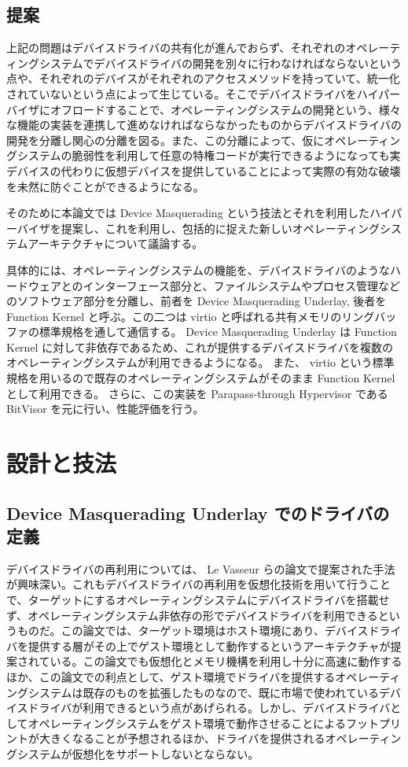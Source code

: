 \documentclass[a4paper,11pt,report]{ltjsbook}
\begin{document}
\section{提案}

上記の問題はデバイスドライバの共有化が進んでおらず、それぞれのオペレーティングシステムでデバイスドライバの開発を別々に行わなければならないという点や、それぞれのデバイスがそれぞれのアクセスメソッドを持っていて、統一化されていないという点によって生じている。そこでデバイスドライバをハイパーバイザにオフロードすることで、オペレーティングシステムの開発という、様々な機能の実装を連携して進めなければならなかったものからデバイスドライバの開発を分離し関心の分離を図る。また、この分離によって、仮にオペレーティングシステムの脆弱性を利用して任意の特権コードが実行できるようになっても実デバイスの代わりに仮想デバイスを提供していることによって実際の有効な破壊を未然に防ぐことができるようになる。

そのために本論文では Device Masquerading という技法とそれを利用したハイパーバイザを提案し、これを利用し、包括的に捉えた新しいオペレーティングシステムアーキテクチャについて議論する。

具体的には、オペレーティングシステムの機能を、デバイスドライバのようなハードウェアとのインターフェース部分と、ファイルシステムやプロセス管理などのソフトウェア部分を分離し、前者を Device Masquerading Underlay, 後者を Function Kernel と呼ぶ。この二つは virtio と呼ばれる共有メモリのリングバッファの標準規格を通して通信する。
Device Masquerading Underlay は Function Kernel に対して非依存であるため、これが提供するデバイスドライバを複数のオペレーティングシステムが利用できるようになる。
また、 virtio という標準規格を用いるので既存のオペレーティングシステムがそのまま Function Kernel として利用できる。
さらに、この実装を Parapass-through Hypervisor である BitVisor を元に行い、性能評価を行う。

\chapter{設計と技法}

\section{Device Masquerading Underlay でのドライバの定義}

デバイスドライバの再利用については、 Le Vasseur らの論文\cite{reuse}で提案された手法が興味深い。これもデバイスドライバの再利用を仮想化技術を用いて行うことで、ターゲットにするオペレーティングシステムにデバイスドライバを搭載せず、オペレーティングシステム非依存の形でデバイスドライバを利用できるというものだ。この論文では、ターゲット環境はホスト環境にあり、デバイスドライバを提供する層がその上でゲスト環境として動作するというアーキテクチャが提案されている。この論文でも仮想化とメモリ機構を利用し十分に高速に動作するほか、この論文での利点として、ゲスト環境でドライバを提供するオペレーティングシステムは既存のものを拡張したものなので、既に市場で使われているデバイスドライバが利用できるという点があげられる。しかし、デバイスドライバとしてオペレーティングシステムをゲスト環境で動作させることによるフットプリントが大きくなることが予想されるほか、ドライバを提供されるオペレーティングシステムが仮想化をサポートしないとならない。
\end{document}
